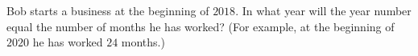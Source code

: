 Bob starts a business at the beginning of $2018$. In what year will the year number equal the number of months he has worked? (For example, at the beginning of $2020$ he has worked $24$ months.)
